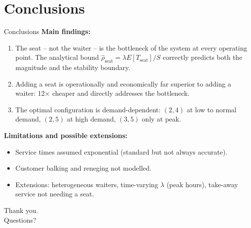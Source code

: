 \documentclass[10pt,aspectratio=169]{beamer}
\begin{document}
\section{Conclusions}
\begin{frame}{Conclusions}
\textbf{Main findings:}
\begin{enumerate}
  \item \alert{The seat -- not the waiter -- is the bottleneck} of the system at
        every operating point. The analytical bound $\hat\rho_{\text{seat}} = \lambda E[T_{\text{seat}}]/S$
        correctly predicts both the magnitude and the stability boundary.
  \item Adding a seat is operationally and economically far superior to adding a
        waiter: \alert{12$\times$ cheaper} and directly addresses the bottleneck.
  \item The optimal configuration is \alert{demand-dependent}: $(2,4)$ at low to
        normal demand, $(2,5)$ at high demand, $(3,5)$ only at peak.
\end{enumerate}

\vspace{0.4cm}
\textbf{Limitations and possible extensions:}
\begin{itemize}
  \item Service times assumed exponential (standard but not always accurate).
  \item Customer balking and reneging not modelled.
  \item Extensions: heterogeneous waiters, time-varying $\lambda$ (peak hours),
        take-away service not needing a seat.
\end{itemize}
\end{frame}

\begin{frame}
\begin{center}
\Huge Thank you. \\
\vspace{1cm}
\Large Questions?
\end{center}
\end{frame}
\end{document}
